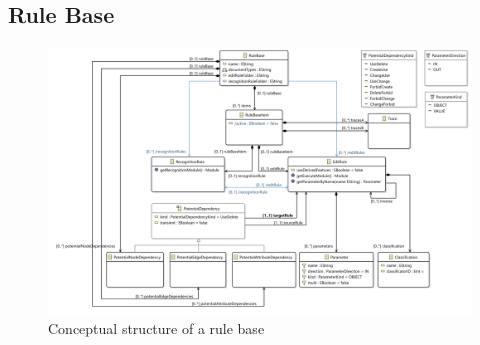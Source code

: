 \newpage


\subsection{Rule Base}

\begin{figure}[h!]
\centering
\includegraphics[width=\textwidth]{images/architecture/rulebase_model}
\caption{Conceptual structure of a rule base}
\end{figure}


